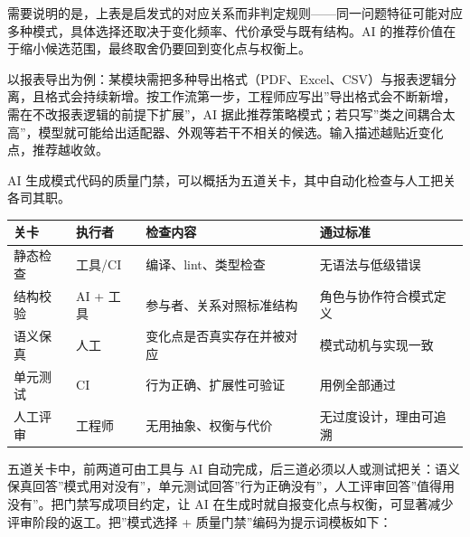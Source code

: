 \documentclass[
]{ctexbook}
\newcounter{none}
\begin{document}
需要说明的是，上表是启发式的对应关系而非判定规则------同一问题特征可能对应多种模式，具体选择还取决于变化频率、代价承受与既有结构。AI
的推荐价值在于缩小候选范围，最终取舍仍要回到变化点与权衡上。

以报表导出为例：某模块需把多种导出格式（PDF、Excel、CSV）与报表逻辑分离，且格式会持续新增。按工作流第一步，工程师应写出''导出格式会不断新增，需在不改报表逻辑的前提下扩展''，AI
据此推荐策略模式；若只写''类之间耦合太高''，模型就可能给出适配器、外观等若干不相关的候选。输入描述越贴近变化点，推荐越收敛。

AI
生成模式代码的质量门禁，可以概括为五道关卡，其中自动化检查与人工把关各司其职。

{\def\LTcaptype{none} %
\begin{longtable}[]{@{}
  >{\raggedright\arraybackslash}p{}
  >{\raggedright\arraybackslash}p{}
  >{\raggedright\arraybackslash}p{}
  >{\raggedright\arraybackslash}p{}@{}}
\toprule\noalign{}
\begin{minipage}[b]{\linewidth}\raggedright
关卡
\end{minipage} & \begin{minipage}[b]{\linewidth}\raggedright
执行者
\end{minipage} & \begin{minipage}[b]{\linewidth}\raggedright
检查内容
\end{minipage} & \begin{minipage}[b]{\linewidth}\raggedright
通过标准
\end{minipage} \\
\midrule\noalign{}
\endhead
\bottomrule\noalign{}
\endlastfoot
静态检查 & 工具/CI & 编译、lint、类型检查 & 无语法与低级错误 \\
结构校验 & AI + 工具 & 参与者、关系对照标准结构 &
角色与协作符合模式定义 \\
语义保真 & 人工 & 变化点是否真实存在并被对应 & 模式动机与实现一致 \\
单元测试 & CI & 行为正确、扩展性可验证 & 用例全部通过 \\
人工评审 & 工程师 & 无用抽象、权衡与代价 & 无过度设计，理由可追溯 \\
\end{longtable}
}

五道关卡中，前两道可由工具与 AI
自动完成，后三道必须以人或测试把关：语义保真回答''模式用对没有''，单元测试回答''行为正确没有''，人工评审回答''值得用没有''。把门禁写成项目约定，让
AI 在生成时就自报变化点与权衡，可显著减少评审阶段的返工。把''模式选择 +
质量门禁''编码为提示词模板如下：
\end{document}
